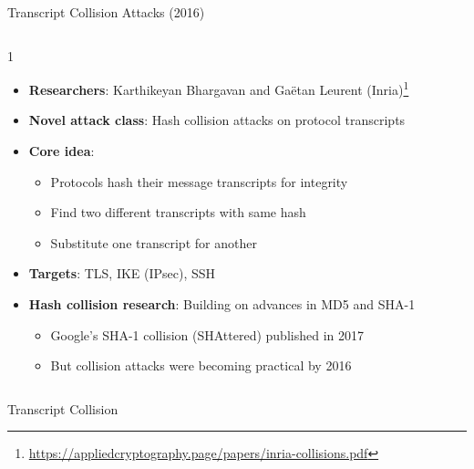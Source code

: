 \documentclass[aspectratio=169, lualatex, handout]{beamer}
\begin{document}
\begin{frame}{Transcript Collision Attacks (2016)}
	\begin{columns}[c]
		\begin{column}{1\textwidth}
			\begin{itemize}[<+->]
				\item \textbf{Researchers}: Karthikeyan Bhargavan and Gaëtan Leurent (Inria)\footnote{\url{https://appliedcryptography.page/papers/inria-collisions.pdf}}
				\item \textbf{Novel attack class}: Hash collision attacks on protocol transcripts
				\item \textbf{Core idea}:
				      \begin{itemize}
					      \item Protocols hash their message transcripts for integrity
					      \item Find two different transcripts with same hash
					      \item Substitute one transcript for another
				      \end{itemize}
				\item \textbf{Targets}: TLS, IKE (IPsec), SSH
				\item \textbf{Hash collision research}: Building on advances in MD5 and SHA-1
				      \begin{itemize}
					      \item Google's SHA-1 collision (SHAttered) published in 2017
					      \item But collision attacks were becoming practical by 2016
				      \end{itemize}
			\end{itemize}
		\end{column}
	\end{columns}
\end{frame}

\begin{frame}{Transcript Collision}
\end{frame}
\end{document}

